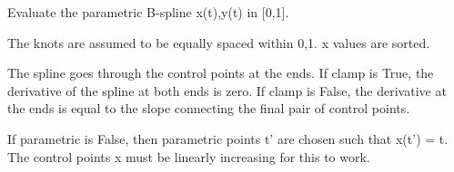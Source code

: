 \documentclass[letterpaper,10pt,english]{sphinxmanual}
\begin{document}
\begin{fulllineitems}
\label{api/bspline:refl1d.bspline.min}
\end{fulllineitems}


\begin{fulllineitems}
\label{api/bspline:refl1d.bspline.pbs}
Evaluate the parametric B-spline x(t),y(t) in {[}0,1{]}.

The knots are assumed to be equally spaced within 0,1.  x values are
sorted.

The spline goes through the control points at the ends.  If clamp is True,
the derivative of the spline at both ends is zero.  If clamp is False,
the derivative at the ends is equal to the slope connecting the final
pair of control points.

If parametric is False, then parametric points t' are chosen such that
x(t') = t.  The control points x must be linearly increasing for this
to work.

\end{fulllineitems}


\begin{fulllineitems}
\label{api/bspline:refl1d.bspline.pbs_control}
\end{fulllineitems}


\begin{fulllineitems}
\label{api/bspline:refl1d.bspline.speed_check}
\end{fulllineitems}


\begin{fulllineitems}
\label{api/bspline:refl1d.bspline.test}
\end{fulllineitems}
\end{document}
